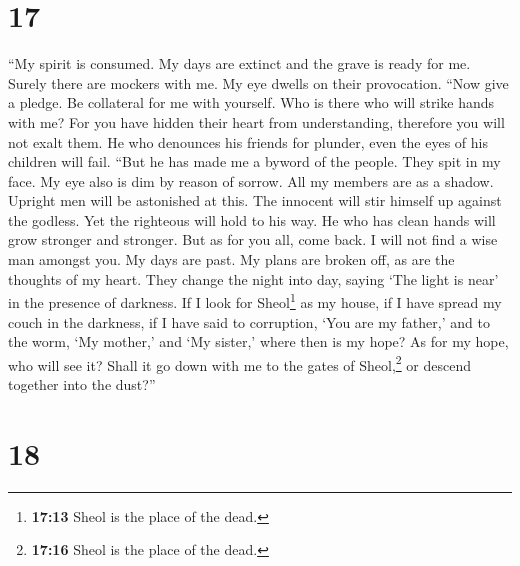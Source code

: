 \hypertarget{section-16}{%
\section{17}\label{section-16}}

 ``My spirit is consumed. My days are extinct and the
grave is ready for me.  Surely there are mockers with me.
My eye dwells on their provocation.  ``Now give a pledge.
Be collateral for me with yourself. Who is there who will strike hands
with me?  For you have hidden their heart from
understanding, therefore you will not exalt them.  He who
denounces his friends for plunder, even the eyes of his children will
fail.  ``But he has made me a byword of the people. They
spit in my face.  My eye also is dim by reason of sorrow.
All my members are as a shadow.  Upright men will be
astonished at this. The innocent will stir himself up against the
godless.  Yet the righteous will hold to his way. He who
has clean hands will grow stronger and stronger.  But as
for you all, come back. I will not find a wise man amongst you.
 My days are past. My plans are broken off, as are the
thoughts of my heart.  They change the night into day,
saying `The light is near' in the presence of darkness. 
If I look for Sheol\footnote{\textbf{17:13} Sheol is the place of the
  dead.} as my house, if I have spread my couch in the darkness,
 if I have said to corruption, `You are my father,' and
to the worm, `My mother,' and `My sister,'  where then is
my hope? As for my hope, who will see it?  Shall it go
down with me to the gates of Sheol,\footnote{\textbf{17:16} Sheol is the
  place of the dead.} or descend together into the dust?''

\hypertarget{section-17}{%
\section{18}\label{section-17}}

